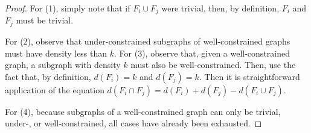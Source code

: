 \begin{proof}
For (1), simply note that if $F_i\cup F_j$ were trivial, then, by definition, $F_i$ and $F_j$ must be trivial.

For (2), observe that under-constrained subgraphs of well-constrained graphs must have density less than $k$. For (3), observe that, given a well-constrained graph, a subgraph with density $k$ must also be well-constrained. Then, use the fact that, by definition, $d(F_i)=k$ and $d(F_j)=k$. Then it is straightforward application of the equation $d(F_i\cap F_j)=d(F_i)+d(F_j)-d(F_i\cup F_j)$.

For (4), because subgraphs of a well-constrained graph can only be trivial, under-, or well-constrained, all cases have already been exhausted.






\end{proof}





